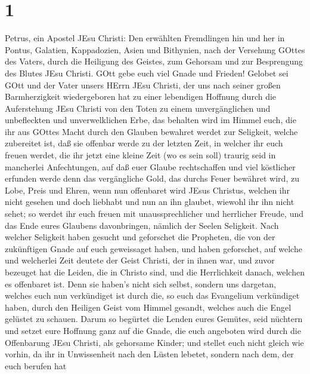 \hypertarget{section}{%
\section{1}\label{section}}

 Petrus, ein Apostel JEsu Christi: Den erwählten Fremdlingen
hin und her in Pontus, Galatien, Kappadozien, Asien und Bithynien,
 nach der Versehung GOttes des Vaters, durch die Heiligung
des Geistes, zum Gehorsam und zur Besprengung des Blutes JEsu Christi.
GOtt gebe euch viel Gnade und Frieden!  Gelobet sei GOtt und
der Vater unsers HErrn JEsu Christi, der uns nach seiner großen
Barmherzigkeit wiedergeboren hat zu einer lebendigen Hoffnung durch die
Auferstehung JEsu Christi von den Toten  zu einem
unvergänglichen und unbefleckten und unverwelklichen Erbe, das behalten
wird im Himmel  euch, die ihr aus GOttes Macht durch den
Glauben bewahret werdet zur Seligkeit, welche zubereitet ist, daß sie
offenbar werde zu der letzten Zeit,  in welcher ihr euch
freuen werdet, die ihr jetzt eine kleine Zeit (wo es sein soll) traurig
seid in mancherlei Anfechtungen,  auf daß euer Glaube
rechtschaffen und viel köstlicher erfunden werde denn das vergängliche
Gold, das durchs Feuer bewähret wird, zu Lobe, Preis und Ehren, wenn nun
offenbaret wird JEsus Christus,  welchen ihr nicht gesehen
und doch liebhabt und nun an ihn glaubet, wiewohl ihr ihn nicht sehet;
so werdet ihr euch freuen mit unaussprechlicher und herrlicher Freude,
 und das Ende eures Glaubens davonbringen, nämlich der
Seelen Seligkeit.  Nach welcher Seligkeit haben gesucht und
geforschet die Propheten, die von der zukünftigen Gnade auf euch
geweissaget haben,  und haben geforschet, auf welche und
welcherlei Zeit deutete der Geist Christi, der in ihnen war, und zuvor
bezeuget hat die Leiden, die in Christo sind, und die Herrlichkeit
danach,  welchen es offenbaret ist. Denn sie haben's nicht
sich selbst, sondern uns dargetan, welches euch nun verkündiget ist
durch die, so euch das Evangelium verkündiget haben, durch den Heiligen
Geist vom Himmel gesandt, welches auch die Engel gelüstet zu schauen.
 Darum so begürtet die Lenden eures Gemütes, seid nüchtern
und setzet eure Hoffnung ganz auf die Gnade, die euch angeboten wird
durch die Offenbarung JEsu Christi,  als gehorsame Kinder;
und stellet euch nicht gleich wie vorhin, da ihr in Unwissenheit nach
den Lüsten lebetet,  sondern nach dem, der euch berufen hat
